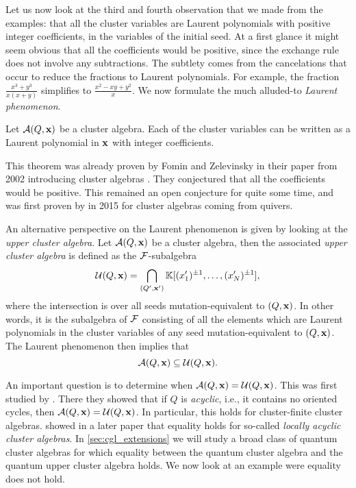 \medskip

Let us now look at the third and fourth observation that we made from the examples:
that all the cluster variables are Laurent polynomials with positive integer
coefficients, in the variables of the initial seed. At a first glance it might seem
obvious that all the coefficients would be positive, since the exchange rule does not
involve any subtractions. The subtlety comes from the cancelations that occur to reduce
the fractions to Laurent polynomials. For example, the fraction $\frac{x^3 +
		y^3}{x(x+y)}$ simplifies to $\frac{x^2 - xy + y^2}{x}$. We now formulate the much
alluded-to \emph{Laurent phenomenon}.
\begin{theorem}\label{thm:laurent_phenomenon}

	Let $\mathcal{A} (Q, \mathbf{x})$ be a cluster algebra. Each of the cluster variables can be written
	as a Laurent polynomial in $\mathbf{x}$ with integer coefficients.
\end{theorem}
%
This theorem was already proven by Fomin and Zelevinsky in their paper from 2002
introducing cluster algebras \parencite[Theorem 3.1]{FominZelevinsky2002CAF}. They conjectured that all the coefficients
would be positive. This remained an open conjecture for quite some time, and was first
proven by \textcite{LeeSchiffler2015PositivityCA} in 2015 for cluster algebras coming
from quivers.

An alternative perspective on the Laurent phenomenon is given by looking at the
\emph{upper cluster algebra}. Let $\mathcal{A}(Q, \mathbf{x})$ be a
cluster algebra, then the associated \emph{upper cluster algebra} is defined as the
$\mathcal{F}$-subalgebra
\begin{equation*}
	\mathcal{U}(Q, \mathbf{x}) = \bigcap_{(Q', \mathbf{x}')} \mathbb{K}[(x_1')^{\pm 1}, \dots, (x'_N)^{\pm 1}],
\end{equation*}
%
where the intersection is over all seeds mutation-equivalent to $(Q, \mathbf{x})$. In other
words, it is the subalgebra of $\mathcal{F}$ consisting of all the elements which are Laurent
polynomials in the cluster variables of any seed mutation-equivalent to $(Q, \mathbf{x})$. The
Laurent phenomenon then implies that
\begin{equation*}
	\mathcal{A}(Q, \mathbf{x}) \subseteq \mathcal{U}(Q, \mathbf{x}).
\end{equation*}

An important question is to determine when $\mathcal{A}(Q, \mathbf{x}) = \mathcal{U}(Q, \mathbf{x})$. This was
first studied by \textcite{BerensteinFominZelevinsky2005CA3UpperBoundsDBC}. There they
showed that if $Q$ is \emph{acyclic}, i.e., it contains no
oriented cycles, then $\mathcal{A}(Q, \mathbf{x}) = \mathcal{U}(Q, \mathbf{x})$. In particular, this holds for
cluster-finite cluster algebras. \Textcite{Muller2013LocallyAcyclicCA} showed in a
later paper that equality holds for so-called \emph{locally acyclic cluster
	algebras}. In \cref{sec:cgl_extensions} we will
study a broad class of quantum cluster algebras for which equality between the quantum
cluster algebra and the quantum upper cluster algebra holds. We now look at an example
were equality does not hold.

